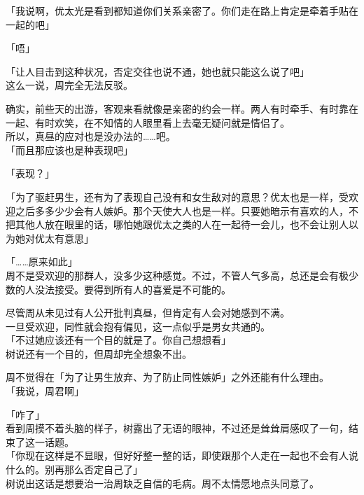 「我说啊，优太光是看到都知道你们关系亲密了。你们走在路上肯定是牵着手贴在一起的吧」

「唔」

「让人目击到这种状况，否定交往也说不通，她也就只能这么说了吧」\\

这么一说，周完全无法反驳。

确实，前些天的出游，客观来看就像是亲密的约会一样。两人有时牵手、有时靠在一起、有时欢笑，在不知情的人眼里看上去毫无疑问就是情侣了。\\

所以，真昼的应对也是没办法的……吧。\\

「而且那应该也是种表现吧」

「表现？」

「为了驱赶男生，还有为了表现自己没有和女生敌对的意思？优太也是一样，受欢迎之后多多少少会有人嫉妒。那个天使大人也是一样。只要她暗示有喜欢的人，不把其他人放在眼里的话，哪怕她跟优太之类的人在一起待一会儿，也不会让别人以为她对优太有意思」

「……原来如此」\\

周不是受欢迎的那群人，没多少这种感觉。不过，不管人气多高，总还是会有极少数的人没法接受。要得到所有人的喜爱是不可能的。

尽管周从未见过有人公开批判真昼，但肯定有人会对她感到不满。\\

一旦受欢迎，同性就会抱有偏见，这一点似乎是男女共通的。\\

「不过她应该还有一个目的就是了。你自己想想看」\\

树说还有一个目的，但周却完全想象不出。

周不觉得在「为了让男生放弃、为了防止同性嫉妒」之外还能有什么理由。\\

「我说，周君啊」

「咋了」\\

看到周摸不着头脑的样子，树露出了无语的眼神，不过还是耸耸肩感叹了一句，结束了这一话题。\\

「你现在这样是不显眼，但好好整一整的话，即使跟那个人走在一起也不会有人说什么的。别再那么否定自己了」\\

树说出这话是想要治一治周缺乏自信的毛病。周不太情愿地点头同意了。\\

